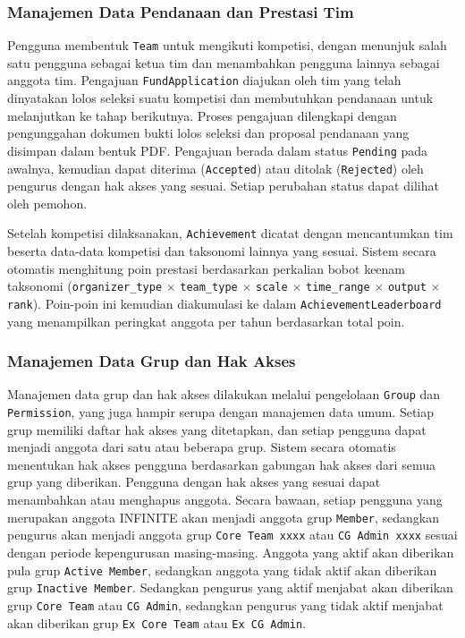 \subsubsection{Manajemen Data Pendanaan dan Prestasi Tim}

Pengguna membentuk \texttt{Team} untuk mengikuti kompetisi, dengan menunjuk salah satu pengguna sebagai ketua tim dan menambahkan pengguna lainnya sebagai anggota tim. Pengajuan \texttt{FundApplication} diajukan oleh tim yang telah dinyatakan lolos seleksi suatu kompetisi dan membutuhkan pendanaan untuk melanjutkan ke tahap berikutnya. Proses pengajuan dilengkapi dengan pengunggahan dokumen bukti lolos seleksi dan proposal pendanaan yang disimpan dalam bentuk PDF. Pengajuan berada dalam status \texttt{Pending} pada awalnya, kemudian dapat diterima (\texttt{Accepted}) atau ditolak (\texttt{Rejected}) oleh pengurus dengan hak akses yang sesuai. Setiap perubahan status dapat dilihat oleh pemohon.

Setelah kompetisi dilaksanakan, \texttt{Achievement} dicatat dengan mencantumkan tim beserta data-data kompetisi dan taksonomi lainnya yang sesuai. Sistem secara otomatis menghitung poin prestasi berdasarkan perkalian bobot keenam taksonomi (\texttt{organizer\_type} $\times$ \texttt{team\_type} $\times$ \texttt{scale} $\times$ \texttt{time\_range} $\times$ \texttt{output} $\times$ \texttt{rank}). Poin-poin ini kemudian diakumulasi ke dalam \texttt{AchievementLeaderboard} yang menampilkan peringkat anggota per tahun berdasarkan total poin.

\subsubsection{Manajemen Data Grup dan Hak Akses}

Manajemen data grup dan hak akses dilakukan melalui pengelolaan \texttt{Group} dan \texttt{Permission}, yang juga hampir serupa dengan manajemen data umum. Setiap grup memiliki daftar hak akses yang ditetapkan, dan setiap pengguna dapat menjadi anggota dari satu atau beberapa grup. Sistem secara otomatis menentukan hak akses pengguna berdasarkan gabungan hak akses dari semua grup yang diberikan. Pengguna dengan hak akses yang sesuai dapat menambahkan atau menghapus anggota. Secara bawaan, setiap pengguna yang merupakan anggota INFINITE akan menjadi anggota grup \texttt{Member}, sedangkan pengurus akan menjadi anggota grup \texttt{Core Team xxxx} atau \texttt{CG Admin xxxx} sesuai dengan periode kepengurusan masing-masing. Anggota yang aktif akan diberikan pula grup \texttt{Active Member}, sedangkan anggota yang tidak aktif akan diberikan grup \texttt{Inactive Member}. Sedangkan pengurus yang aktif menjabat akan diberikan grup \texttt{Core Team} atau \texttt{CG Admin}, sedangkan pengurus yang tidak aktif menjabat akan diberikan grup \texttt{Ex Core Team} atau \texttt{Ex CG Admin}.

